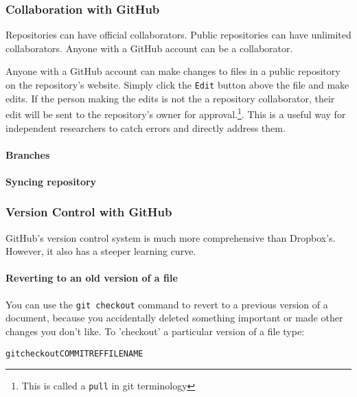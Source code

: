 \subsubsection{Collaboration with GitHub}

Repositories can have official collaborators. Public repositories can have unlimited collaborators. Anyone with a GitHub account can be a collaborator. 
 

Anyone with a GitHub account can make changes to files in a public repository on the repository's website. Simply click the \texttt{Edit} button above the file and make edits. If the person making the edits is not the a repository collaborator, their edit will be sent to the repository's owner for approval.\footnote{This is called a \texttt{pull} in git terminology}. This is a useful way for independent researchers to catch errors and directly address them.

\paragraph{Branches}

\paragraph{Syncing repository}

\subsubsection{Version Control with GitHub}

GitHub's version control system is much more comprehensive than Dropbox's. However, it also has a steeper learning curve.

\paragraph{Reverting to an old version of a file}

You can use the {\tt{git checkout}} command to revert to a previous version of a document, because you accidentally deleted something important or made other changes you don't like. To 'checkout' a particular version of a file type:

\begin{knitrout}
\color{fgcolor}\begin{kframe}
\begin{alltt}
git checkout COMMITREF FILENAME
\end{alltt}
\end{kframe}
\end{knitrout}


